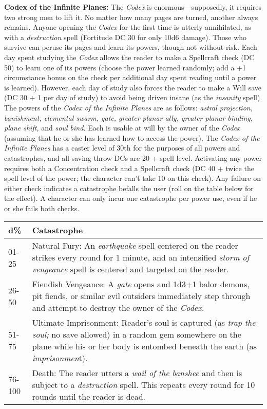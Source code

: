 \documentclass{article}
\begin{document}
\textbf{Codex of the Infinite Planes: }The \textit{Codex} is enormous---supposedly, 
it requires two strong men to lift it. No matter how many pages are turned, another 
always remains. Anyone opening the \textit{Codex }for the first time is utterly 
annihilated, as with a \textit{destruction }spell (Fortitude DC 30 for only 10d6 
damage). Those who survive can peruse its pages and learn its powers, though not 
without risk. Each day spent studying the \textit{Codex }allows the reader to make 
a Spellcraft check (DC 50) to learn one of its powers (choose the power learned 
randomly; add a +1 circumstance bonus on the check per additional day spent reading 
until a power is learned). However, each day of study also forces the reader to 
make a Will save (DC 30 + 1 per day of study) to avoid being driven insane (as 
the \textit{insanity }spell). The powers of the \textit{Codex of the Infinite Planes 
}are as follows: \textit{astral projection, banishment, elemental swarm, gate, 
greater planar ally, greater planar binding, plane shift, }and \textit{soul bind. 
}Each is usable at will by the owner of the \textit{Codex }(assuming that he or 
she has learned how to access the power). The \textit{Codex of the Infinite Planes 
}has a caster level of 30th for the purposes of all powers and catastrophes, and 
all saving throw DCs are 20 + spell level. Activating any power requires both a 
Concentration check and a Spellcraft check (DC 40 + twice the spell level of the 
power; the character can't take 10 on this check). Any failure on either check 
indicates a catastrophe befalls the user (roll on the table below for the effect). 
A character can only incur one catastrophe per power use, even if he or she fails 
both checks. 

\begin{tabular}{|>{\raggedright}p{27pt}|>{\raggedright}p{299pt}|}
\hline
d\textbf{\%} & C\textbf{atastrophe }\tabularnewline
\hline
01-25 & Natural Fury: An \textit{earthquake }spell centered on the reader strikes 
every round for 1 minute, and an intensified \textit{storm of vengeance }spell 
is centered and targeted on the reader. \tabularnewline
\hline
26-50 & Fiendish Vengeance: A \textit{gate }opens and 1d3+1 balor demons, pit fiends, 
or similar evil outsiders immediately step through and attempt to destroy the owner 
of the \textit{Codex. }\tabularnewline
\hline
51-75 & Ultimate Imprisonment: Reader's soul is captured (as \textit{trap the soul; 
}no save allowed) in a random gem somewhere on the plane while his or her body 
is entombed beneath the earth (as \textit{imprisonmen}t). \tabularnewline
\hline
76-100 & Death: The reader utters a \textit{wail of the banshee }and then is subject 
to a \textit{destruction }spell. This repeats every round for 10 rounds until the 
reader is dead. \tabularnewline
\hline
\end{tabular}
\end{document}
